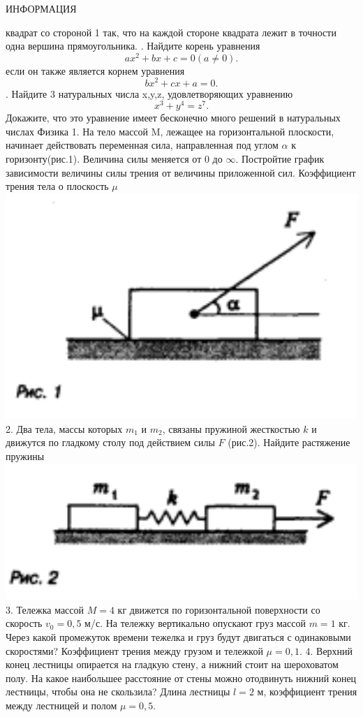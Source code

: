 \begin{center}
    \small ИНФОРМАЦИЯ
\end{center}

\begin{multicols*}{3}

\small \noindent квадрат со стороной 1 так, что на каждой стороне квадрата лежит в точности одна вершина прямоугольника.
. Найдите корень уравнения
$$
a x^2+b x+c=0(a \neq 0) .
$$
\noindent если он также является корнем уравнения
$$
b x^2+c x+a=0 .
$$
. Найдите 3 натуральных числа x,y,z, удовлетворяющих уравнению
$$
x^3+y^4=z^7 .
$$
\noindent Докажите, что это уравнение имеет бесконечно много решений в натуральных числах
\normalsize \small Физика
\newline
\indent \small 1. На тело массой M, лежащее на горизонтальной плоскости, начинает действовать переменная сила, направленная под углом $\alpha$ к горизонту(рис.1). Величина силы меняется от 0 до $\infty$. Постройтие график зависимости величины силы трения от величины приложенной сил. Коэффициент трения тела о плоскость $\mu$
\includegraphics[scale=0.3]{images/image1.png}
\indent \small 2. Два тела, массы которых $m_1$ и $m_2$, связаны пружиной жесткостью $k$ и движутся по гладкому столу под действием силы $F$ (рис.2). Найдите растяжение пружины
\includegraphics[scale=0.3]{images/image2.png}
\indent \small 3. Тележка массой $M = 4$ кг движется по горизонтальной поверхности со скорость $v_0 = 0,5$ м/с. На тележку вертикально опускают груз массой $m = 1$ кг. Через какой промежуток времени тежелка и груз будут двигаться с одинаковыми скоростями? Коэффициент трения между грузом и тележкой $\mu = 0,1$.
\indent \small 4. Верхний конец лестницы опирается на гладкую стену, а нижний стоит на шероховатом полу. На какое наибольшее расстояние от стены можно отодвинуть нижний конец лестницы, чтобы она не скользила? Длина лестницы $l = 2$ м, коэффициент трения между лестницей и полом $\mu = 0,5$.


\end{multicols*}
